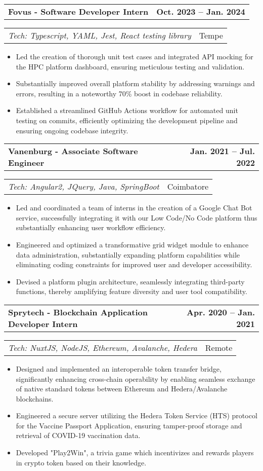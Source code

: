 \documentclass[letterpaper,11pt]{article}
\makeatletter
\newcommand{\resumeItem}[1]{
  \item\small{
    {#1 \vspace{-2pt}}
  }
}
\newcommand{\resumeSubheading}[2]{
  \vspace{-2pt}\item
    \begin{tabular*}{1.0\textwidth}[t]{l@{\extracolsep{\fill}}r}
      \textbf{#1} & \textbf{\small #2} \\
    \end{tabular*}\vspace{-7pt}
}
\newcommand{\resumeSubText}[2]{
  \vspace{-14pt}\item
    \begin{tabular*}{1.0\textwidth}[t]{l@{\extracolsep{\fill}}r}
      {#1} & {\small #2} \\
    \end{tabular*}\vspace{-7pt}
}
\newcommand{\resumeItemListStart}{\begin{itemize}}
\newcommand{\resumeItemListEnd}{\end{itemize}\vspace{-5pt}}
\makeatother
\begin{document}
    \resumeSubheading
      {Fovus - Software Developer Intern}{Oct. 2023 -- Jan. 2024}
    \resumeSubText {\emph{Tech: Typescript, YAML, Jest, React testing library}}{Tempe}
      \resumeItemListStart
        \resumeItem{Led the creation of thorough unit test cases and integrated API mocking for the HPC platform dashboard, ensuring meticulous testing and validation.}
        \resumeItem{Substantially improved overall platform stability by addressing warnings and errors, resulting in a noteworthy 70\% boost in codebase reliability.}
        \resumeItem{Established a streamlined GitHub Actions workflow for automated unit testing on commits, efficiently optimizing the development pipeline and ensuring ongoing codebase integrity.}
      \resumeItemListEnd

    \resumeSubheading
      {Vanenburg - Associate Software Engineer}{Jan. 2021 -- Jul. 2022}
    \resumeSubText {\emph{Tech: Angular2, JQuery, Java, SpringBoot}}{Coimbatore}
      \resumeItemListStart
        \resumeItem{Led and coordinated a team of interns in the creation of a Google Chat Bot service, successfully integrating it with our Low Code/No Code platform thus substantially enhancing user workflow efficiency.}
        \resumeItem{Engineered and optimized a transformative grid widget module to enhance data administration, substantially expanding platform capabilities while eliminating coding constraints for improved user and developer accessibility.}
        \resumeItem{Devised a platform plugin architecture, seamlessly integrating third-party functions, thereby amplifying feature diversity and user tool compatibility.}
      \resumeItemListEnd

    \resumeSubheading
      {Sprytech - Blockchain Application Developer Intern}{Apr. 2020 -- Jan. 2021}
      \resumeSubText{\emph{Tech: NuxtJS, NodeJS, Ethereum, Avalanche, Hedera}}{Remote}
      \resumeItemListStart
        \resumeItem{Designed and implemented an interoperable token transfer bridge, significantly enhancing cross-chain operability by enabling seamless exchange of native standard tokens between Ethereum and Hedera/Avalanche blockchains.}
        \resumeItem{Engineered a secure server utilizing the Hedera Token Service (HTS) protocol for the Vaccine Passport Application, ensuring tamper-proof storage and retrieval of COVID-19 vaccination data.}
        \resumeItem{Developed "Play2Win", a trivia game which incentivizes and rewards players in crypto token based on their knowledge.}
    \resumeItemListEnd
    
    
\end{document}
